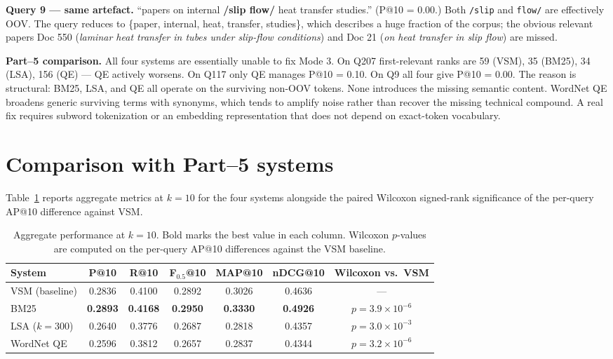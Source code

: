 \documentclass[11pt]{article}
\begin{document}
\textbf{Query 9 --- same artefact.} ``papers on internal \textbf{/slip
flow/} heat transfer studies.'' (P@10 = 0.00.) Both \texttt{/slip} and
\texttt{flow/} are effectively OOV. The query reduces to \{paper,
internal, heat, transfer, studies\}, which describes a huge fraction of
the corpus; the obvious relevant papers Doc 550 (\emph{laminar heat
transfer in tubes under slip-flow conditions}) and Doc 21 (\emph{on heat
transfer in slip flow}) are missed.

\textbf{Part--5 comparison.} All four systems are essentially unable to
fix Mode 3. On Q207 first-relevant ranks are 59 (VSM), 35 (BM25), 34
(LSA), 156 (QE) --- QE actively worsens. On Q117 only QE manages
P@10 = 0.10. On Q9 all four give P@10 = 0.00. The reason is structural:
BM25, LSA, and QE all operate on the surviving non-OOV tokens. None
introduces the missing semantic content. WordNet QE broadens generic
surviving terms with synonyms, which tends to amplify noise rather than
recover the missing technical compound. A real fix requires subword
tokenization or an embedding representation that does not depend on
exact-token vocabulary.

\section{Comparison with Part--5 systems}

Table~\ref{tab:partfive} reports aggregate metrics at $k=10$ for the four
systems alongside the paired Wilcoxon signed-rank significance of the
per-query AP@10 difference against VSM.

\begin{table}[h]
\centering
\small
\begin{tabular}{lcccccc}
\toprule
System & P@10 & R@10 & F$_{0.5}$@10 & MAP@10 & nDCG@10 & Wilcoxon vs.\ VSM \\
\midrule
VSM (baseline) & 0.2836 & 0.4100 & 0.2892 & 0.3026 & 0.4636 & --- \\
BM25 & \textbf{0.2893} & \textbf{0.4168} & \textbf{0.2950} & \textbf{0.3330} & \textbf{0.4926} & $p = 3.9\!\times\!10^{-6}$ \\
LSA ($k=300$) & 0.2640 & 0.3776 & 0.2687 & 0.2818 & 0.4357 & $p = 3.0\!\times\!10^{-3}$ \\
WordNet QE & 0.2596 & 0.3812 & 0.2657 & 0.2837 & 0.4344 & $p = 3.2\!\times\!10^{-6}$ \\
\bottomrule
\end{tabular}
\caption{Aggregate performance at $k=10$. Bold marks the best value in
each column. Wilcoxon $p$-values are computed on the per-query AP@10
differences against the VSM baseline.}
\label{tab:partfive}
\end{table}
\end{document}
